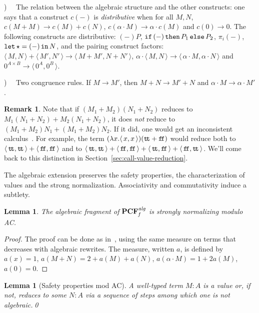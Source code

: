 \documentclass[10pt]{article}
\theoremstyle{plain}
\newtheorem{lemma}[theorem]{Lemma}
\theoremstyle{definition}
\newtheorem{remark}[theorem]{Remark}
\newcommand{\define}[1]{{\em #1}}
\newcommand{\pair}[1]{{\langle\,{#1}\,\rangle}}
\newcommand{\ttrue}{{\tt t}\!{\tt t}}
\newcommand{\ffalse}{{\tt f}\!{\tt f}}
\newcommand{\ifterm}[3]{{{\tt if}\,{#1}\,{\tt then}\,{#2}\,{\tt else}\,{#3}}}
\newcommand{\letunit}[2]{{\tt let}\,\star={#1}\,{\tt in}\,{#2}}
\begin{document}
\smallskip
{})~~
 The relation between the algebraic structure and the other
  constructs: one says that a construct $c(-)$ is
  \define{distributive} when for all $M,N$, $c(M+M) \to c(M) + c(N)$, 
  $c(\alpha\cdot M) \to \alpha\cdot c(M)$ and 
  $c(0) \to 0$.
The following constructs are distributive:
$(-)P$,
$\ifterm{(-)}{P_1}{P_2}$,
$\pi_i(-)$,
$\letunit{(-)}{N}$,
and the pairing construct factors: 
$\pair{M,N} + \pair{M',N'} \to
  \pair{M + M',N + N'}$, 
$\alpha\cdot\pair{M,N} \to
  \pair{\alpha\cdot M, \alpha\cdot N}$ and
$0^{A\times B}
  \to
  \pair{0^A, 0^B}$.

\smallskip
{})~~
 Two congruence rules. If $M\to M'$, then 
 $M+N \to M'+N$ and $\alpha\cdot M \to \alpha\cdot M'$.

\begin{remark}\label{rem:red-strat}
  Note that if $(M_1+M_2)(N_1+N_2)$ reduces to
  $M_1(N_1+N_2)+M_2(N_1+N_2)$, it does {\em not} reduce to
  $(M_1+M_2)N_1 + (M_1+M_2)N_2$. If it did, one would get an
  inconsistent calculus~\cite{ad08}. For example, the term $ (\lambda
  x.\pair{x,x})(\ttrue+\ffalse) $ would reduce both to
  $\pair{\ttrue,\ttrue}+\pair{\ffalse,\ffalse}$ and to
  $\pair{\ttrue,\ttrue}+\pair{\ffalse,\ffalse}+
  \pair{\ttrue,\ffalse}+\pair{\ffalse,\ttrue}$.
  We'll come back to this distinction in Section~\ref{sec:call-value-reduction}.
\end{remark}

The algebraic extension preserves the safety properties, the
characterization of values and the strong normalization.
Associativity and commutativity induce a subtlety.

\begin{lemma}
  \label{lem:sn-AC}
  The algebraic fragment of ${\bf PCF}_{\it f}^{\it alg}$ is strongly
  normalizing modulo AC.
\end{lemma}

\begin{proof}
  The proof can be done as in~\cite{ad08}, using the same measure on
  terms that decreases with algebraic rewrites. The measure, written
  $a$, is defined by $a(x)=1$, $a(M+N)=2+a(M)+a(N)$,
  $a(\alpha\cdot M)=1+2a(M)$, $a(0)=0$.
\end{proof}

\begin{lemma}[Safety properties mod AC]
  \label{lem:safety-prop-alg-modAC}
  A well-typed term $M:A$ is a value or, if not,
  reduces to some $N:A$ via a sequence of steps among
  which one is {\em not} algebraic.\qed
\end{lemma}
\end{document}
